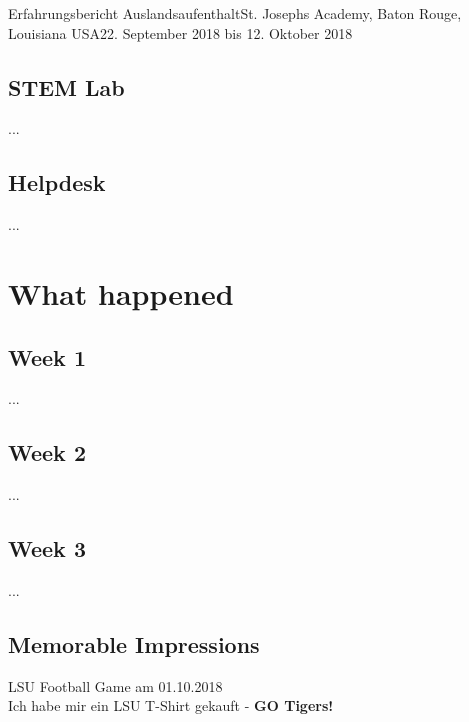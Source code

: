 \documentclass[oneside,openany,headings=optiontotoc,11pt,numbers=noenddot]{article}
\begin{document}
\begin{worksheet}{Erfahrungsbericht Auslandsaufenthalt}{St. Joseph\grq{}s Academy, Baton Rouge, Louisiana USA}{22. September 2018 bis 12. Oktober 2018}
		\subsection{STEM Lab}
		...
		\subsection{Helpdesk}
		...
		\section{What happened}
		\subsection{Week 1}
		...
		\subsection{Week 2}
		...
		\subsection{Week 3}
		...
		\subsection{Memorable Impressions}
		LSU Football Game am 01.10.2018\\
		Ich habe mir ein LSU T-Shirt gekauft - \textbf{GO Tigers!}
	\end{worksheet}
\end{document}
